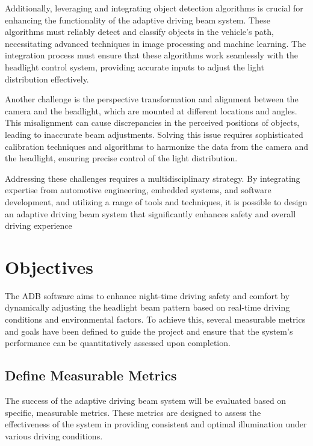 Additionally, leveraging and integrating object detection algorithms is crucial for enhancing the functionality of the adaptive driving beam system. These algorithms must reliably detect and classify objects in the vehicle's path, necessitating advanced techniques in image processing and machine learning. The integration process must ensure that these algorithms work seamlessly with the headlight control system, providing accurate inputs to adjust the light distribution effectively.

Another challenge is the perspective transformation and alignment between the camera and the headlight, which are mounted at different locations and angles. This misalignment can cause discrepancies in the perceived positions of objects, leading to inaccurate beam adjustments. Solving this issue requires sophisticated calibration techniques and algorithms to harmonize the data from the camera and the headlight, ensuring precise control of the light distribution.

Addressing these challenges requires a multidisciplinary strategy. By integrating expertise from automotive engineering, embedded systems, and software development, and utilizing a range of tools and techniques, it is possible to design an adaptive driving beam system that significantly enhances safety and overall driving experience


    

\section{Objectives}

The ADB software aims to enhance night-time driving safety and comfort by dynamically adjusting the headlight beam pattern based on real-time driving conditions and environmental factors. To achieve this, several measurable metrics and goals have been defined to guide the project and ensure that the system's performance can be quantitatively assessed upon completion.


\subsection{Define Measurable Metrics } %
The success of the adaptive driving beam system will be evaluated based on specific, measurable metrics. These metrics are designed to assess the effectiveness of the system in providing consistent and optimal illumination under various driving conditions. 

